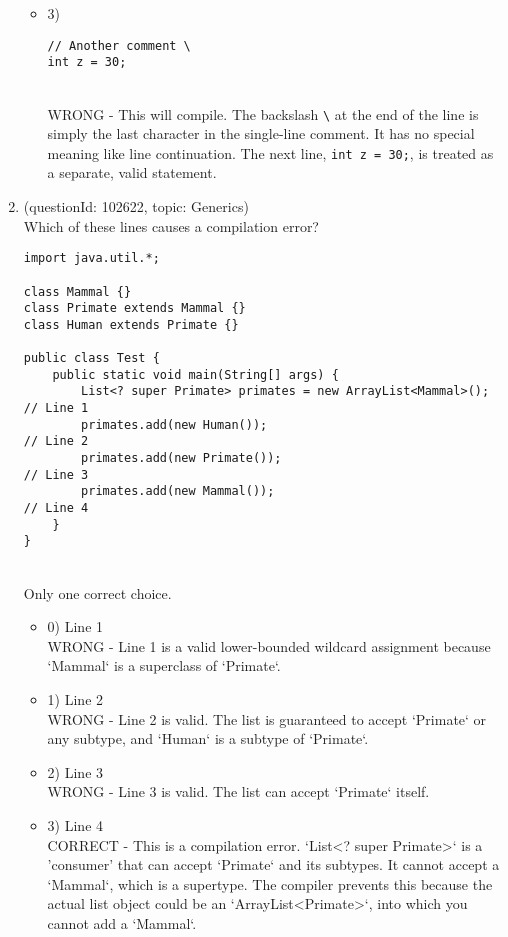 \documentclass[12pt]{article}
\begin{document}
\begin{enumerate}[label=(\arabic*)]
\begin{itemize}
\item 3) \begin{verbatim}
// Another comment \
int z = 30;
\end{verbatim}
 \\ 
WRONG - This will compile. The backslash \verb|\| at the end of the line is simply the last character in the single-line comment. It has no special meaning like line continuation. The next line, \verb|int z = 30;|, is treated as a separate, valid statement.

\end{itemize}
\item (questionId: 102622, topic: Generics) \\ 
Which of these lines causes a compilation error?\begin{verbatim}
import java.util.*;

class Mammal {}
class Primate extends Mammal {}
class Human extends Primate {}

public class Test {
    public static void main(String[] args) {
        List<? super Primate> primates = new ArrayList<Mammal>(); // Line 1
        primates.add(new Human());                                // Line 2
        primates.add(new Primate());                              // Line 3
        primates.add(new Mammal());                               // Line 4
    }
}
\end{verbatim}
\\ \noindent Only one correct choice. 
\begin{itemize}
\item 0) Line 1
 \\ 
WRONG - Line 1 is a valid lower-bounded wildcard assignment because `Mammal` is a superclass of `Primate`.

\item 1) Line 2
 \\ 
WRONG - Line 2 is valid. The list is guaranteed to accept `Primate` or any subtype, and `Human` is a subtype of `Primate`.

\item 2) Line 3
 \\ 
WRONG - Line 3 is valid. The list can accept `Primate` itself.

\item 3) Line 4
 \\ 
CORRECT - This is a compilation error. `List<? super Primate>` is a 'consumer' that can accept `Primate` and its subtypes. It cannot accept a `Mammal`, which is a supertype. The compiler prevents this because the actual list object could be an `ArrayList<Primate>`, into which you cannot add a `Mammal`.


\end{itemize}
\end{enumerate}
\end{document}
